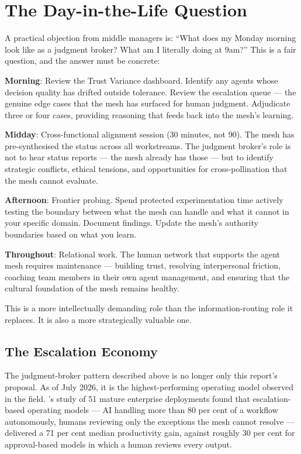 \section{The Day-in-the-Life Question}

A practical objection from middle managers is: ``What does my Monday morning look like as a judgment broker? What am I literally doing at 9am?'' This is a fair question, and the answer must be concrete:

\textbf{Morning}: Review the Trust Variance dashboard. Identify any agents whose decision quality has drifted outside tolerance. Review the escalation queue --- the genuine edge cases that the mesh has surfaced for human judgment. Adjudicate three or four cases, providing reasoning that feeds back into the mesh's learning.

\textbf{Midday}: Cross-functional alignment session (30 minutes, not 90). The mesh has pre-synthesised the status across all workstreams. The judgment broker's role is not to hear status reports --- the mesh already has those --- but to identify strategic conflicts, ethical tensions, and opportunities for cross-pollination that the mesh cannot evaluate.

\textbf{Afternoon}: Frontier probing. Spend protected experimentation time actively testing the boundary between what the mesh can handle and what it cannot in your specific domain. Document findings. Update the mesh's authority boundaries based on what you learn.

\textbf{Throughout}: Relational work. The human network that supports the agent mesh requires maintenance --- building trust, resolving interpersonal friction, coaching team members in their own agent management, and ensuring that the cultural foundation of the mesh remains healthy.

This is a more intellectually demanding role than the information-routing role it replaces. It is also a more strategically valuable one.

\subsection{The Escalation Economy}

The judgment-broker pattern described above is no longer only this report's proposal. As of July 2026, it is the highest-performing operating model observed in the field. \textcite{Pereira2026Playbook}'s study of 51 mature enterprise deployments found that escalation-based operating models --- AI handling more than 80 per cent of a workflow autonomously, humans reviewing only the exceptions the mesh cannot resolve --- delivered a 71 per cent median productivity gain, against roughly 30 per cent for approval-based models in which a human reviews every output.

